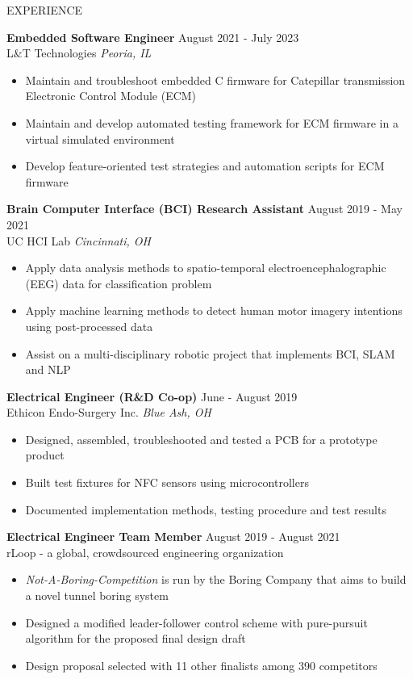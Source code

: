 \documentclass{lib/resume} %
\begin{document}
\begin{rSection}{EXPERIENCE}

    \textbf{Embedded Software Engineer} \hfill August 2021 - July 2023 \\
    L\&T Technologies \hfill \textit{Peoria, IL}
    \begin{itemize}
        \itemsep -4pt {}
        \item Maintain and troubleshoot embedded C firmware for Catepillar transmission Electronic Control Module (ECM)
        \item Maintain and develop automated testing framework for ECM firmware in a virtual simulated environment
        \item Develop feature-oriented test strategies and automation scripts for ECM firmware
    \end{itemize}

    \textbf{Brain Computer Interface (BCI) Research Assistant} \hfill August 2019 - May 2021 \\
    UC HCI Lab \hfill \textit{Cincinnati, OH}
    \begin{itemize}
        \itemsep -4pt {}
        \item Apply data analysis methods to spatio-temporal electroencephalographic (EEG) data for classification problem
        \item Apply machine learning methods to detect human motor imagery intentions using post-processed data
        \item Assist on a multi-disciplinary robotic project that implements BCI, SLAM and NLP
    \end{itemize}


    \textbf{Electrical Engineer (R\&D Co-op)} \hfill June - August 2019\\
    Ethicon Endo-Surgery Inc. \hfill \textit{Blue Ash, OH}
    \begin{itemize}
        \itemsep -4pt {}
        \item Designed, assembled, troubleshooted and tested a PCB for a prototype product
        \item Built test fixtures for NFC sensors using microcontrollers
        \item Documented implementation methods, testing procedure and test results
    \end{itemize}

    \textbf{Electrical Engineer Team Member} \hfill August 2019 - August 2021
    \\	rLoop - a global, crowdsourced engineering organization \hfill \textit{}
    \begin{itemize}
        \itemsep -4pt {}
        \item \textit{Not-A-Boring-Competition} is run by the Boring Company that aims to build a novel tunnel boring system
        \item Designed a modified leader-follower control scheme with pure-pursuit algorithm for the proposed final design draft
        \item Design proposal selected with 11 other finalists among 390 competitors
    \end{itemize}




\end{rSection}
\end{document}
